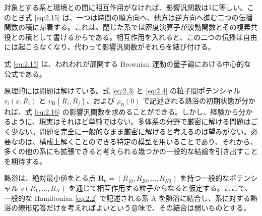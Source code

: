 対象とする系と環境との間に相互作用がなければ、影響汎関数は1に等しい。このとき式 \eqref{eq:2.15} は、一つは時間の順方向へ、他方は逆方向へ進む二つの伝播関数の積に帰着する。これは、閉じた系では密度演算子が波動関数とその複素共役との積として書けるからである。相互作用を入れると、この二つの伝播は自由には起こらなくなり、代わって影響汎関数がそれらを結び付ける。

式 \eqref{eq:2.15} は、われわれが展開する Brownian 運動の量子論における中心的な公式である。


原理的には問題は解けている。式 \eqref{eq:2.3} と \eqref{eq:2.4} の粒子間ポテンシャル $v_i(x,R_i)$ と $v_{\mathrm B}(R_i,R_j)$、および $\rho_{\mathrm B}(0)$ で記述される熱浴の初期状態が分かれば、式 \eqref{eq:2.16} の影響汎関数を求めることができる。しかし、経験から分かるように、現実はそれほど単純ではない。多体系の分野で厳密に解ける問題はごく少ない。問題を完全に一般的なまま厳密に解けると考えるのは望みがない。必要なのは、構成上解くことのできる特定の模型を用いることであり、それから、多くの他の系にも拡張できると考えられる幾つかの一般的な結論を引き出すことを期待する。

熱浴は、絶対最小値をとる点 $\bm R_0=(R_{10},R_{20},\ldots,R_{N0})$ を持つ一般的なポテンシャル $v(R_1,\ldots,R_N)$ を通じて相互作用する粒子からなると仮定する。ここで、一般的な Hamiltonian \eqref{eq:2.2} で記述される系 A を熱浴に結合し、系に対する熱浴の線形応答だけを考えればよいという意味で、その結合は弱いものとする。

